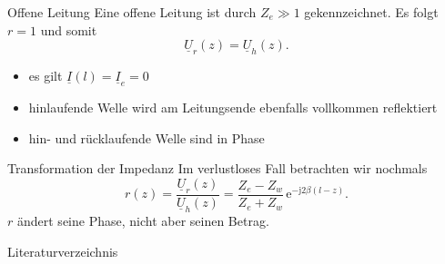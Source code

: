 \documentclass{beamer}
\begin{document}
\begin{frame}{Offene Leitung}
Eine offene Leitung ist durch $Z_{e} \gg 1$ gekennzeichnet. Es folgt $r = 1$ und somit
\[
\underline{U}_{r}(z) = \underline{U}_{h}(z).
\]

\begin{itemize}
    \item<2-> es gilt $\underline{I}(l) = \underline{I}_{e} = 0$
    \item<3-> hinlaufende Welle wird am Leitungsende ebenfalls vollkommen reflektiert
    \item<4-> hin- und rücklaufende Welle sind in Phase
\end{itemize}

\end{frame}



\begin{frame}{Transformation der Impedanz}
Im verlustloses Fall betrachten wir nochmals
\[
r(z) = \frac{\underline{U}_{r}(z)}{\underline{U}_{h}(z)} =
\frac{Z_{e}-Z_{w}}{Z_{e}+Z_{w}} \, \mathrm{e}^{-\mathrm{j} 2 \beta (l-z)}.
\]
$r$ ändert seine Phase, nicht aber seinen Betrag.


\end{frame}


\begin{frame}{Literaturverzeichnis}
\printbibliography
\end{frame}
\end{document}
